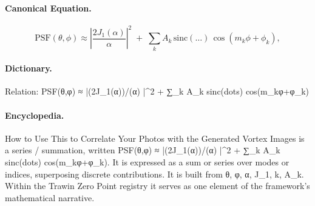 \paragraph{Canonical Equation.}
\[
\text{PSF}(\theta,\phi) \approx \left|\frac{2J_1(\alpha)}{\alpha}\right|^2 \;+\; \sum_k A_k\, \mathrm{sinc}(\dots)\,\cos(m_k\phi+\phi_k),
\]

\paragraph{Dictionary.}
Relation: PSF(θ,φ) ≈ |(2J\_1(α))/(α) |\textasciicircum{}2 + ∑\_k A\_k sinc(dots) cos(m\_kφ+φ\_k)

\paragraph{Encyclopedia.}
How to Use This to Correlate Your Photos with the Generated Vortex Images is a series / summation, written PSF(θ,φ) ≈ |(2J\_1(α))/(α) |\textasciicircum{}2 + ∑\_k A\_k sinc(dots) cos(m\_kφ+φ\_k). It is expressed as a sum or series over modes or indices, superposing discrete contributions. It is built from θ, φ, α, J\_1, k, A\_k. Within the Trawin Zero Point registry it serves as one element of the framework's mathematical narrative.
